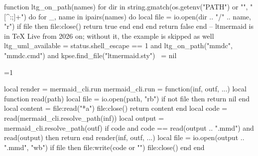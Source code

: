 \ifluatex
  \usepackage{luacode}
  \begin{luacode*}
    function ltg_on_path(names)
      for dir in string.gmatch(os.getenv("PATH") or "", "[^:;]+") do
        for _, name in ipairs(names) do
          local file = io.open(dir .. "/" .. name, "r")
          if file then
            file:close()
            return true
          end
        end
      end
      return false
    end
    -- ltmermaid is in TeX Live from 2026 on; without it, the example is skipped as well
    ltg_uml_available = status.shell_escape == 1 and ltg_on_path({"mmdc", "mmdc.cmd"}) and kpse.find_file("ltmermaid.sty") ~= nil
  \end{luacode*}
  \ifnum{}=1
    \usepackage[Renderer={mmdc -p puppeteer.json}]{ltmermaid}
    \begin{luacode*}
      local render = mermaid_cli.run
      mermaid_cli.run = function(inf, outf, ...)
        local function read(path)
          local file = io.open(path, "rb")
          if not file then
            return nil
          end
          local content = file:read("*a")
          file:close()
          return content
        end
        local code = read(mermaid_cli.resolve_path(inf))
        local output = mermaid_cli.resolve_path(outf)
        if code and code == read(output .. ".mmd") and read(output) then
          return
        end
        render(inf, outf, ...)
        local file = io.open(output .. ".mmd", "wb")
        if file then
          file:write(code or "")
          file:close()
        end
      end
    \end{luacode*}
  \fi
\fi
